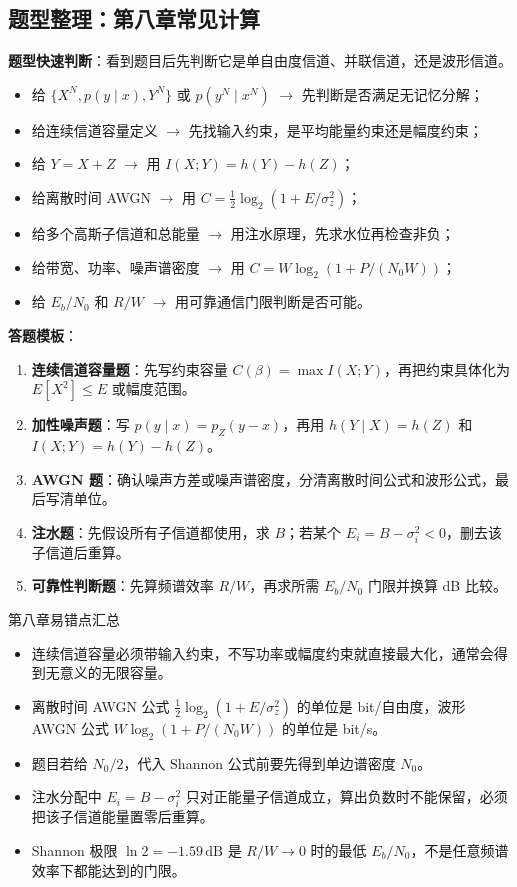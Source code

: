 \subsection{题型整理：第八章常见计算}

\textbf{题型快速判断}：看到题目后先判断它是单自由度信道、并联信道，还是波形信道。
\begin{itemize}
  \item 给 $\{X^N,p(y\mid x),Y^N\}$ 或 $p(y^N\mid x^N)$ $\to$ 先判断是否满足无记忆分解；
  \item 给连续信道容量定义 $\to$ 先找输入约束，是平均能量约束还是幅度约束；
  \item 给 $Y=X+Z$ $\to$ 用 $I(X;Y)=h(Y)-h(Z)$；
  \item 给离散时间 AWGN $\to$ 用 $C=\frac12\log_2(1+E/\sigma_z^2)$；
  \item 给多个高斯子信道和总能量 $\to$ 用注水原理，先求水位再检查非负；
  \item 给带宽、功率、噪声谱密度 $\to$ 用 $C=W\log_2(1+P/(N_0W))$；
  \item 给 $E_b/N_0$ 和 $R/W$ $\to$ 用可靠通信门限判断是否可能。
\end{itemize}

\textbf{答题模板}：
\begin{enumerate}
  \item \textbf{连续信道容量题}：先写约束容量 $C(\beta)=\max I(X;Y)$，再把约束具体化为 $E[X^2]\le E$ 或幅度范围。
  \item \textbf{加性噪声题}：写 $p(y\mid x)=p_Z(y-x)$，再用 $h(Y\mid X)=h(Z)$ 和 $I(X;Y)=h(Y)-h(Z)$。
  \item \textbf{AWGN 题}：确认噪声方差或噪声谱密度，分清离散时间公式和波形公式，最后写清单位。
  \item \textbf{注水题}：先假设所有子信道都使用，求 $B$；若某个 $E_i=B-\sigma_i^2<0$，删去该子信道后重算。
  \item \textbf{可靠性判断题}：先算频谱效率 $R/W$，再求所需 $E_b/N_0$ 门限并换算 dB 比较。
\end{enumerate}

\begin{warningBox}{第八章易错点汇总}
\begin{itemize}
  \item 连续信道容量必须带输入约束，不写功率或幅度约束就直接最大化，通常会得到无意义的无限容量。
  \item 离散时间 AWGN 公式 $\frac12\log_2(1+E/\sigma_z^2)$ 的单位是 bit/自由度，波形 AWGN 公式 $W\log_2(1+P/(N_0W))$ 的单位是 bit/s。
  \item 题目若给 $N_0/2$，代入 Shannon 公式前要先得到单边谱密度 $N_0$。
  \item 注水分配中 $E_i=B-\sigma_i^2$ 只对正能量子信道成立，算出负数时不能保留，必须把该子信道能量置零后重算。
  \item Shannon 极限 $\ln2=-1.59\,\mathrm{dB}$ 是 $R/W\to0$ 时的最低 $E_b/N_0$，不是任意频谱效率下都能达到的门限。
\end{itemize}
\end{warningBox}


